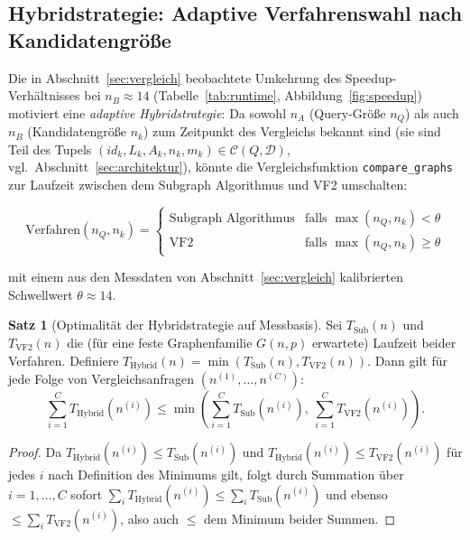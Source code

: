 \documentclass[a4paper,12pt, twoside]{report}
\theoremstyle{definition}
\newtheorem{satz}{Satz}
\begin{document}
\subsection{Hybridstrategie: Adaptive Verfahrenswahl nach Kandidatengröße}
\label{sec:hybrid}

Die in Abschnitt~\ref{sec:vergleich} beobachtete Umkehrung des Speedup-Verhältnisses bei $n_B\approx 14$ (Tabelle~\ref{tab:runtime}, Abbildung~\ref{fig:speedup}) motiviert eine \emph{adaptive Hybridstrategie}: Da sowohl $n_A$ (Query-Größe $n_Q$) als auch $n_B$ (Kandidatengröße $n_k$) zum Zeitpunkt des Vergleichs bekannt sind (sie sind Teil des Tupels $(id_k,L_k,A_k,n_k,m_k)\in\mathcal{C}(Q,\mathcal{D})$, vgl.\ Abschnitt~\ref{sec:architektur}), könnte die Vergleichsfunktion \texttt{compare\_graphs} zur Laufzeit zwischen dem Subgraph Algorithmus und VF2 umschalten:

\[
\mathrm{Verfahren}(n_Q,n_k) = \begin{cases}
\text{Subgraph Algorithmus} & \text{falls } \max(n_Q,n_k) < \theta \\
\text{VF2} & \text{falls } \max(n_Q,n_k) \ge \theta
\end{cases}
\]

mit einem aus den Messdaten von Abschnitt~\ref{sec:vergleich} kalibrierten Schwellwert $\theta\approx 14$.

\begin{satz}[Optimalität der Hybridstrategie auf Messbasis]
	\label{satz:hybrid}
	Sei $T_{\text{Sub}}(n)$ und $T_{\text{VF2}}(n)$ die (für eine feste Graphenfamilie $G(n,p)$ erwartete) Laufzeit beider Verfahren. Definiere $T_{\text{Hybrid}}(n) = \min(T_{\text{Sub}}(n), T_{\text{VF2}}(n))$. Dann gilt für jede Folge von Vergleichsanfragen $(n^{(1)},\ldots,n^{(C)})$:
	\[
	\sum_{i=1}^{C} T_{\text{Hybrid}}(n^{(i)}) \le \min\left(\sum_{i=1}^{C} T_{\text{Sub}}(n^{(i)}),\ \sum_{i=1}^{C} T_{\text{VF2}}(n^{(i)})\right).
	\]
\end{satz}

\begin{proof}
	Da $T_{\text{Hybrid}}(n^{(i)}) \le T_{\text{Sub}}(n^{(i)})$ und $T_{\text{Hybrid}}(n^{(i)}) \le T_{\text{VF2}}(n^{(i)})$ für jedes $i$ nach Definition des Minimums gilt, folgt durch Summation über $i=1,\ldots,C$ sofort $\sum_i T_{\text{Hybrid}}(n^{(i)}) \le \sum_i T_{\text{Sub}}(n^{(i)})$ und ebenso $\le \sum_i T_{\text{VF2}}(n^{(i)})$, also auch $\le$ dem Minimum beider Summen.
\end{proof}
\end{document}
